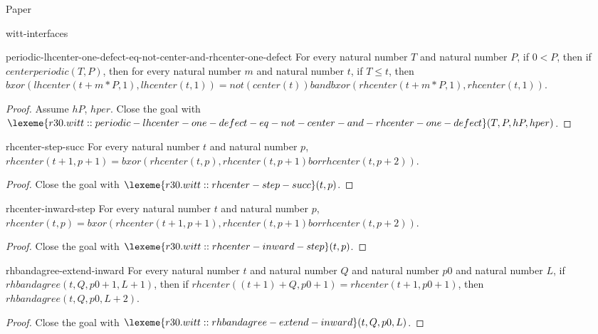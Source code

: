 \begin{lexlean}{Paper}
\begin{section}{witt-interfaces}
  \begin{theorem}{periodic-lhcenter-one-defect-eq-not-center-and-rhcenter-one-defect}
  For every natural number \(T\) and natural number \(P\), if \(0 < P\), then if \(centerperiodic(T, P)\), then for every natural number \(m\) and natural number \(t\), if \(T ≤ t\), then \(bxor(lhcenter(t + m * P, 1), lhcenter(t, 1)) = not(center(t)) band bxor(rhcenter(t + m * P, 1), rhcenter(t, 1))\).
  \begin{proof}
  Assume \(hP\), \(hper\).
  Close the goal with \(\lexeme{r30.witt::periodic-lhcenter-one-defect-eq-not-center-and-rhcenter-one-defect}(T, P, hP, hper)\).
  \end{proof}
  \end{theorem}

  \begin{theorem}{rhcenter-step-succ}
  For every natural number \(t\) and natural number \(p\), \(rhcenter(t + 1, p + 1) = bxor(rhcenter(t, p), rhcenter(t, p + 1) bor rhcenter(t, p + 2))\).
  \begin{proof}
  Close the goal with \(\lexeme{r30.witt::rhcenter-step-succ}(t, p)\).
  \end{proof}
  \end{theorem}

  \begin{theorem}{rhcenter-inward-step}
  For every natural number \(t\) and natural number \(p\), \(rhcenter(t, p) = bxor(rhcenter(t + 1, p + 1), rhcenter(t, p + 1) bor rhcenter(t, p + 2))\).
  \begin{proof}
  Close the goal with \(\lexeme{r30.witt::rhcenter-inward-step}(t, p)\).
  \end{proof}
  \end{theorem}

  \begin{theorem}{rhbandagree-extend-inward}
  For every natural number \(t\) and natural number \(Q\) and natural number \(p0\) and natural number \(L\), if \(rhbandagree(t, Q, p0 + 1, L + 1)\), then if \(rhcenter((t + 1) + Q, p0 + 1) = rhcenter(t + 1, p0 + 1)\), then \(rhbandagree(t, Q, p0, L + 2)\).
  \begin{proof}
  Close the goal with \(\lexeme{r30.witt::rhbandagree-extend-inward}(t, Q, p0, L)\).
  \end{proof}
  \end{theorem}


\end{section}
\end{lexlean}
